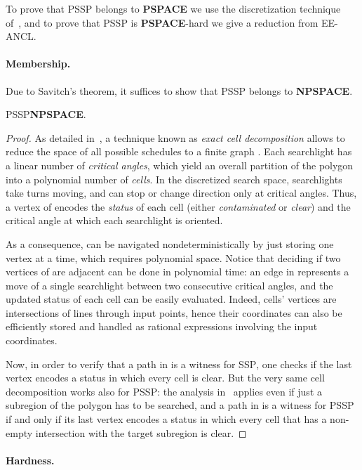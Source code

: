 \documentclass{style}
\newcommand{\complexityclass}[1]{\textbf{#1}}
\newcommand{\computproblem}[1]{\textsc{#1}}
\newcommand{\PSPACE}{\complexityclass{PSPACE}\xspace}
\newcommand{\NPSPACE}{\complexityclass{NPSPACE}\xspace}
\newcommand{\EEANCL}{\computproblem{EE-ANCL}\xspace}
\newcommand{\SSP}{\computproblem{SSP}\xspace}
\newcommand{\PSSP}{\computproblem{PSSP}\xspace}
\begin{document}
To prove that \PSSP belongs to \PSPACE we use the discretization technique of~\cite{bullo}, and to prove that \PSSP is \PSPACE-hard we give a reduction from \EEANCL.

\paragraph{Membership.}

Due to Savitch's theorem, it suffices to show that \PSSP belongs to \NPSPACE.

\begin{lemma} \label{lemma1}
\PSSP  \NPSPACE.
\end{lemma}
\begin{proof}
As detailed in~\cite{bullo}, a technique known as \emph{exact cell decomposition} allows to reduce the space of all possible schedules to a finite graph . Each searchlight has a linear number of \emph{critical angles}, which yield an overall partition of the polygon into a polynomial number of \emph{cells}. In the discretized search space, searchlights take turns moving, and can stop or change direction only at critical angles. Thus, a vertex of  encodes the \emph{status} of each cell (either \emph{contaminated} or \emph{clear}) and the critical angle at which each searchlight is oriented.

As a consequence,  can be navigated nondeterministically by just storing one vertex at a time, which requires polynomial space. Notice that deciding if two vertices of  are adjacent can be done in polynomial time: an edge in  represents a move of a single searchlight between two consecutive critical angles, and the updated status of each cell can be easily evaluated. Indeed, cells' vertices are intersections of lines through input points, hence their coordinates can also be efficiently stored and handled as rational expressions involving the input coordinates.

Now, in order to verify that a path in  is a witness for \SSP, one checks if the last vertex encodes a status in which every cell is clear. But the very same cell decomposition works also for \PSSP: the analysis in~\cite{bullo} applies even if just a subregion of the polygon has to be searched, and a path in  is a witness for \PSSP if and only if its last vertex encodes a status in which every cell that has a non-empty intersection with the target subregion is clear.
\end{proof}

\paragraph{Hardness.}
\end{document}
